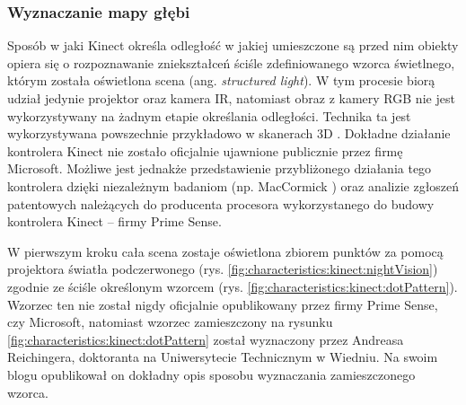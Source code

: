 	\subsubsection*{Wyznaczanie mapy głębi}
	Sposób w jaki Kinect określa odległość w jakiej umieszczone są przed nim obiekty opiera się o rozpoznawanie zniekształceń ściśle zdefiniowanego wzorca świetlnego, którym została oświetlona scena (ang. \emph{structured light}). W tym procesie biorą udział jedynie projektor oraz kamera IR, natomiast obraz z kamery RGB nie jest wykorzystywany na żadnym etapie określania odległości. Technika ta jest wykorzystywana powszechnie przykładowo w skanerach 3D \cite{david2016,lmi2016}. Dokładne działanie kontrolera Kinect nie zostało oficjalnie ujawnione publicznie przez firmę Microsoft. Możliwe jest jednakże przedstawienie przybliżonego działania tego kontrolera dzięki niezależnym badaniom (np. MacCormick \cite{MacCormick2011}) oraz analizie zgłoszeń patentowych \cite{patent:20080106746,patent:20100020078,patent:20100118123} należących do producenta procesora wykorzystanego do budowy kontrolera Kinect -- firmy Prime Sense.
		
	W pierwszym kroku cała scena zostaje oświetlona zbiorem punktów za pomocą projektora światła podczerwonego (rys. \ref{fig:characteristics:kinect:nightVision}) zgodnie ze ściśle określonym wzorcem (rys. \ref{fig:characteristics:kinect:dotPattern}). Wzorzec ten nie został nigdy oficjalnie opublikowany przez firmy Prime Sense, czy Microsoft, natomiast wzorzec zamieszczony na rysunku \ref{fig:characteristics:kinect:dotPattern} został wyznaczony przez Andreasa Reichingera, doktoranta na Uniwersytecie Technicznym w Wiedniu. Na swoim blogu opublikował on dokładny opis sposobu wyznaczania zamieszczonego wzorca\cite{reichinger2011}.
		

